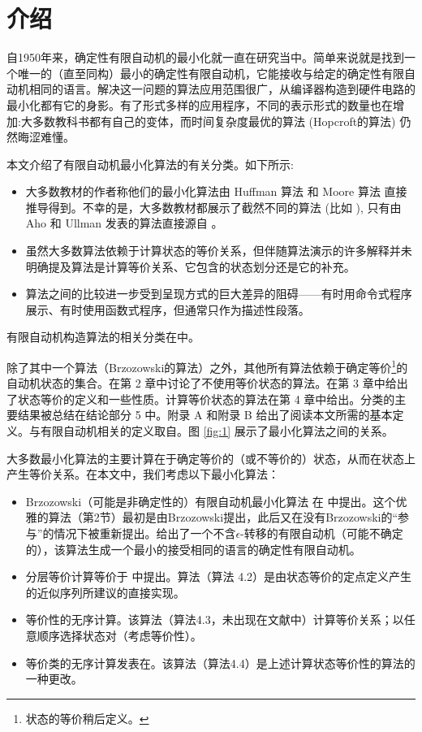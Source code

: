 

\chapter{介绍}

自1950年来，确定性有限自动机的最小化就一直在研究当中。简单来说就是找到一个唯一的（直至同构）最小的确定性有限自动机，它能接收与给定的确定性有限自动机相同的语言。解决这一问题的算法应用范围很广，从编译器构造到硬件电路的最小化都有它的身影。有了形式多样的应用程序，不同的表示形式的数量也在增加:大多数教科书都有自己的变体，而时间复杂度最优的算法 (Hopcroft的算法) 仍然晦涩难懂。

本文介绍了有限自动机最小化算法的有关分类。如下所示:

\begin{itemize}
    \item 大多数教材的作者称他们的最小化算法由 Huffman 算法 \cite{Huff54} 和 Moore 算法 \cite{Moor56} 直接推导得到。不幸的是，大多数教材都展示了截然不同的算法 (比如 \cite{AU92,ASU86,Hu79,Wood87}), 只有由 Aho 和 Ullman 发表的算法直接源自 \cite{Huff54, Moor56}。
    \item 虽然大多数算法依赖于计算状态的等价关系，但伴随算法演示的许多解释并未明确提及算法是计算等价关系、它包含的状态划分还是它的补充。
    \item 算法之间的比较进一步受到呈现方式的巨大差异的阻碍——有时用命令式程序展示、有时使用函数式程序，但通常只作为描述性段落。
\end{itemize}

有限自动机构造算法的相关分类在\cite{Wats93}中。

除了其中一个算法（Brzozowski的算法）之外，其他所有算法依赖于确定等价\footnote{状态的等价稍后定义。}的自动机状态的集合。在第 2 章中讨论了不使用等价状态的算法。在第 3 章中给出了状态等价的定义和一些性质。计算等价状态的算法在第 4 章中给出。分类的主要结果被总结在结论部分 5 中。附录 A 和附录 B 给出了阅读本文所需的基本定义。与有限自动机相关的定义取自\cite{Wats93}。图 \ref{fig:1} 展示了最小化算法之间的关系。

大多数最小化算法的主要计算在于确定等价的（或不等价的）状态，从而在状态上产生等价关系。在本文中，我们考虑以下最小化算法：
\begin{itemize}
    \item Brzozowski（可能是非确定性的）有限自动机最小化算法 在 \cite{Brzo62} 中提出。这个优雅的算法（第2节）最初是由Brzozowski提出，此后又在没有Brzozowski的“参与”的情况下被重新提出。给出了一个不含$\epsilon$-转移的有限自动机（可能不确定的），该算法生成一个最小的接受相同的语言的确定性有限自动机。

    \item 分层等价计算等价于 \cite{Wood87, Moor56, Brau88, Urba89} 中提出。算法（算法 4.2）是由状态等价的定点定义产生的近似序列所建议的直接实现。

    \item 等价性的无序计算。该算法（算法4.3，未出现在文献中）计算等价关系；以任意顺序选择状态对（考虑等价性）。

    \item 等价类的无序计算发表在\cite{ASU86}。该算法（算法4.4）是上述计算状态等价性的算法的一种更改。

\end{itemize}

